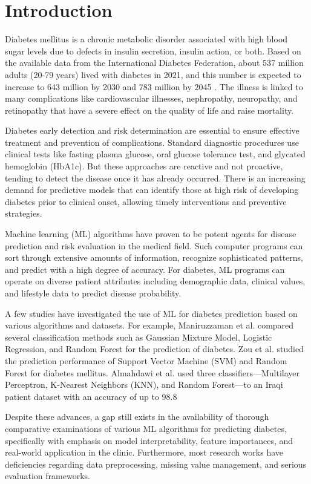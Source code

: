 \documentclass[conference]{IEEEtran}
\begin{document}
\section{Introduction}
Diabetes mellitus is a chronic metabolic disorder associated with high blood sugar levels due to defects in insulin secretion, insulin action, or both. Based on the available data from the International Diabetes Federation, about 537 million adults (20-79 years) lived with diabetes in 2021, and this number is expected to increase to 643 million by 2030 and 783 million by 2045 \cite{idf2021}. The illness is linked to many complications like cardiovascular illnesses, nephropathy, neuropathy, and retinopathy that have a severe effect on the quality of life and raise mortality. 

Diabetes early detection and risk determination are essential to ensure effective treatment and prevention of complications. Standard diagnostic procedures use clinical tests like fasting plasma glucose, oral glucose tolerance test, and glycated hemoglobin (HbA1c). But these approaches are reactive and not proactive, tending to detect the disease once it has already occurred. There is an increasing demand for predictive models that can identify those at high risk of developing diabetes prior to clinical onset, allowing timely interventions and preventive strategies.

Machine learning (ML) algorithms have proven to be potent agents for disease prediction and risk evaluation in the medical field. Such computer programs can sort through extensive amounts of information, recognize sophisticated patterns, and predict with a high degree of accuracy. For diabetes, ML programs can operate on diverse patient attributes including demographic data, clinical values, and lifestyle data to predict disease probability.

A few studies have investigated the use of ML for diabetes prediction based on various algorithms and datasets. For example, Maniruzzaman et al. \cite{maniruzzaman2017} compared several classification methods such as Gaussian Mixture Model, Logistic Regression, and Random Forest for the prediction of diabetes. Zou et al. \cite{zou2018} studied the prediction performance of Support Vector Machine (SVM) and Random Forest for diabetes mellitus. Almahdawi et al. \cite{almahdawi2023} used three classifiers—Multilayer Perceptron, K-Nearest Neighbors (KNN), and Random Forest—to an Iraqi patient dataset with an accuracy of up to 98.8%

Despite these advances, a gap still exists in the availability of thorough comparative examinations of various ML algorithms for predicting diabetes, specifically with emphasis on model interpretability, feature importances, and real-world application in the clinic. Furthermore, most research works have deficiencies regarding data preprocessing, missing value management, and serious evaluation frameworks.
\end{document}
